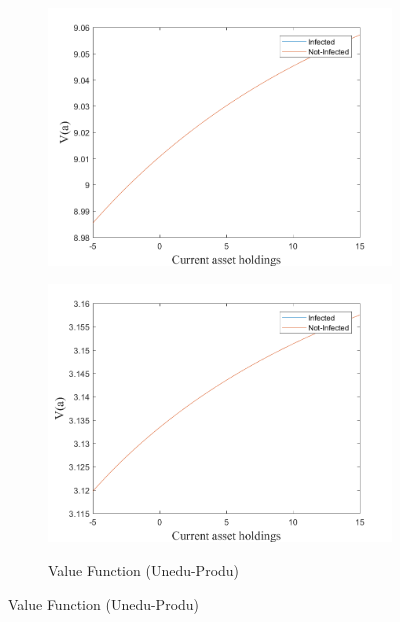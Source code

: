 \begin{figure}[H]
\begin{subfigure}{0.5\textwidth}
   \includegraphics[width=\linewidth,height = 0.22\textheight]{figures/mio/FIG15.png}
    \label{fig_dert}
\end{subfigure}
\hspace*{\fill}
\begin{subfigure}{0.5\textwidth}\caption{Value Function (Unedu-Produ)}
   \includegraphics[width=\linewidth,height = 0.22\textheight]{figures/mio/FIG16.png}
    \label{fig:x_b}
\end{subfigure}
\hspace*{\fill}
\label{lafigura3}
\end{figure}
\newpage
